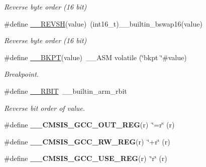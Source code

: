 \begin{DoxyCompactItemize}
\begin{DoxyCompactList}\small\item\em Reverse byte order (16 bit) \end{DoxyCompactList}\item 
\#define \mbox{\hyperlink{group___c_m_s_i_s___core___instruction_interface_gae580812686119c9c5cf3c11a7519a404}{\+\_\+\+\_\+\+R\+E\+V\+SH}}(value)~(int16\+\_\+t)\+\_\+\+\_\+builtin\+\_\+bswap16(value)
\begin{DoxyCompactList}\small\item\em Reverse byte order (16 bit) \end{DoxyCompactList}\item 
\#define \mbox{\hyperlink{group___c_m_s_i_s___core___instruction_interface_ga15ea6bd3c507d3e81c3b3a1258e46397}{\+\_\+\+\_\+\+B\+K\+PT}}(value)~\+\_\+\+\_\+\+A\+SM volatile (\char`\"{}bkpt \char`\"{}\#value)
\begin{DoxyCompactList}\small\item\em Breakpoint. \end{DoxyCompactList}\item 
\#define \mbox{\hyperlink{group___c_m_s_i_s___core___instruction_interface_gab83768933a612816fad669db5488366f}{\+\_\+\+\_\+\+R\+B\+IT}}~\+\_\+\+\_\+builtin\+\_\+arm\+\_\+rbit
\begin{DoxyCompactList}\small\item\em Reverse bit order of value. \end{DoxyCompactList}\item 
\mbox{\label{group___c_m_s_i_s___core___instruction_interface_gabc17e391c13c71702366c67cba39c276}} 
\#define {\bfseries \+\_\+\+\_\+\+C\+M\+S\+I\+S\+\_\+\+G\+C\+C\+\_\+\+O\+U\+T\+\_\+\+R\+EG}(r)~\char`\"{}=r\char`\"{} (r)
\item 
\mbox{\label{group___c_m_s_i_s___core___instruction_interface_ga03179f79efee45c226dddfb8d824ad83}} 
\#define {\bfseries \+\_\+\+\_\+\+C\+M\+S\+I\+S\+\_\+\+G\+C\+C\+\_\+\+R\+W\+\_\+\+R\+EG}(r)~\char`\"{}+r\char`\"{} (r)
\item 
\mbox{\label{group___c_m_s_i_s___core___instruction_interface_ga9d94dee7402367961d2cf0accc00fd97}} 
\#define {\bfseries \+\_\+\+\_\+\+C\+M\+S\+I\+S\+\_\+\+G\+C\+C\+\_\+\+U\+S\+E\+\_\+\+R\+EG}(r)~\char`\"{}r\char`\"{} (r)

\end{DoxyCompactItemize}
